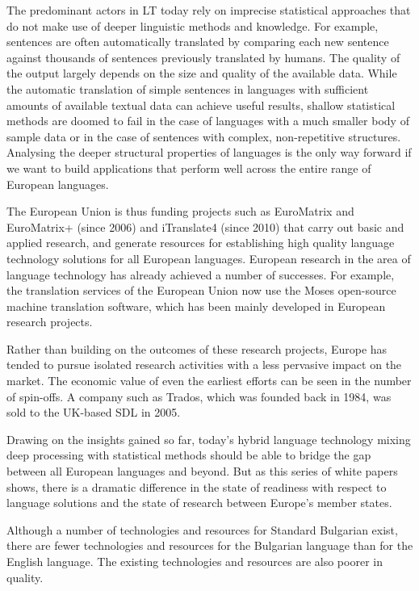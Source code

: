 \documentclass[]{../../metanetpaper}
\begin{document}
\begin{multicols}{2}
The predominant actors in LT today rely on imprecise statistical approaches that do not make use of deeper linguistic methods and knowledge. For example, sentences are often automatically translated by comparing each new sentence against thousands of sentences previously translated by humans. The quality of the output largely depends on the size and quality of the available  data. While the automatic translation of simple sentences in languages with sufficient amounts of available textual data can achieve useful results, shallow statistical methods are doomed to fail in the case of languages with a much smaller body of sample data or in the case of sentences with complex, non-repetitive structures. Analysing the deeper structural properties of languages is the only way forward if we want to build applications that perform well across the entire range of European languages.


The European Union is thus funding projects such as EuroMatrix and EuroMatrix+ (since 2006) and iTranslate4 (since 2010) that carry out basic and applied research, and generate resources for establishing high quality language technology solutions for all European languages. 
European research in the area of language technology has already achieved a number of successes. For example, the translation services of the European Union now use the Moses open-source machine translation software, which has been mainly developed in European research projects. 

Rather than building on the outcomes of these research projects, Europe has tended to pursue isolated research activities with a less pervasive impact on the market. The economic value of even the earliest efforts can be seen in the number of spin-offs. A company such as Trados, which was founded back in 1984, was sold to the UK-based SDL in 2005.


Drawing on the insights gained so far, today’s hybrid language technology mixing deep processing with statistical methods should be able to bridge the gap between all European languages and beyond. But as this series of white papers shows, there is a dramatic difference in the state of readiness with respect to language solutions and the state of research between Europe’s member states. 

Although a number of technologies and resources for Standard Bulgarian exist, there are fewer technologies and resources for the Bulgarian language than for the English language. The existing technologies and resources are also poorer in quality.


\end{multicols}
\end{document}
